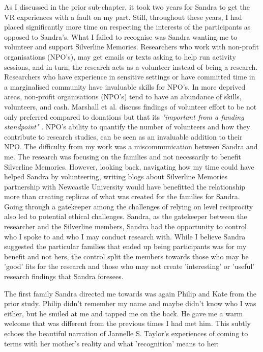 As I discussed in the prior sub-chapter, it took two years for Sandra to get the VR experiences with a fault on my part. Still, throughout these years, I had placed significantly more time on respecting the interests of the participants as opposed to Sandra's. What I failed to recognise was Sandra wanting me to volunteer and support Silverline Memories. Researchers who work with non-profit organisations (NPO's), may get emails or texts asking to help run activity sessions, and in turn, the research acts as a volunteer instead of being a research. Researchers who have experience in sensitive settings or have committed time in a marginalised community have invaluable skills for NPO's.  In more deprived areas, non-profit organisations (NPO's) tend to have an abundance of skills, volunteers, and cash. Marshall et al. discuss findings of volunteer effort to be not only preferred compared to donations but that its \textit{"important from a funding standpoint"} \citep{marshall_accountable_2016}. NPO's ability to quantify the number of volunteers and how they contribute to research studies, can be seen as an invaluable addition to their NPO. The difficulty from my work was a miscommunication between Sandra and me. The research was focusing on the families and not necessarily to benefit Silverline Memories. However, looking back, navigating how my time could have helped Sandra by volunteering, writing blogs about Silverline Memories partnership with Newcastle University would have benefitted the relationship more than creating replicas of what was created for the families for Sandra. Going through a gatekeeper among the challenges of relying on level reciprocity also led to potential ethical challenges. Sandra, as the gatekeeper between the researcher and the Silverline members, Sandra had the opportunity to control who I spoke to and who I may conduct research with. While I believe Sandra suggested the particular families that ended up being participants was for my benefit and not hers, the control split the members towards those who may be 'good' fits for the research and those who may not create 'interesting' or 'useful' research findings that Sandra foresees.  

The first family Sandra directed me towards was again Philip and Kate from the prior study. Philip didn't remember my name and maybe didn't know who I was either, but he smiled at me and tapped me on the back. He gave me a warm welcome that was different from the previous times I had met him. This subtly echoes the beautiful narration of Jannelle S. Taylor's experiences of coming to terms with her mother's reality and what 'recognition' means to her:

